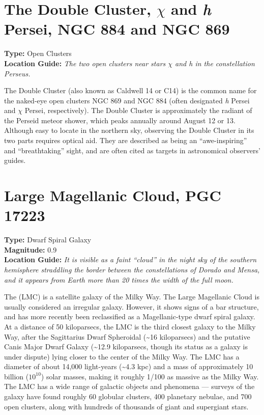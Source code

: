 \section{The Double Cluster, \texorpdfstring{$\chi$ and \emph{h}}{chi and h} Persei, NGC 884 and NGC 869}
\textbf{Type:} Open Clusters \\
\textbf{Location Guide:} \textit{The two open clusters near stars $\chi$ and h in the constellation Perseus.}

The Double Cluster (also known as Caldwell 14 or C14) is the common
name for the naked-eye open clusters NGC 869 and NGC 884 (often
designated \emph{h} Persei and $\chi$ Persei, respectively). The
Double Cluster is approximately the radiant of the Perseid meteor
shower, which peaks annually around August 12 or 13. Although easy to
locate in the northern sky, observing the Double Cluster in its two
parts requires optical aid. They are described as being an
``awe-inspiring'' and ``breathtaking'' sight, and are often cited as 
targets in astronomical observers' guides.


\section{Large Magellanic Cloud, PGC 17223}
\textbf{Type:} Dwarf Spiral Galaxy \\
\textbf{Magnitude:} 0.9 \\
\textbf{Location Guide:} \textit{It is visible as a faint ``cloud'' in
  the night sky of the southern hemisphere straddling the border
  between the constellations of Dorado and Mensa, and it appears from
  Earth more than 20 times the width of the full moon.}

The  (LMC) is a satellite galaxy of
the Milky Way. The Large Magellanic Cloud is usually considered an
irregular galaxy. However, it shows signs of a bar structure, and has more recently
been reclassified as a Magellanic-type dwarf spiral galaxy. At a
distance of 50 kiloparsecs, the LMC is the third closest galaxy to the
Milky Way, after the Sagittarius Dwarf Spheroidal (\textasciitilde16
kiloparsecs) and the putative Canis Major Dwarf Galaxy
(\textasciitilde12.9 kiloparsecs, though its status as a galaxy is
under dispute) lying closer to the center of the Milky Way. The LMC
has a diameter of about 14,000 light-years (\textasciitilde4.3 kpc)
and a mass of approximately 10 billion ($10^{10}$) solar
masses, making it roughly 1/100 as massive as the Milky Way. The LMC
has a wide range of galactic objects and phenomena --- surveys of the
galaxy have found roughly 60 globular clusters, 400 planetary nebulae,
and 700 open clusters, along with hundreds of thousands of giant and
supergiant stars.

